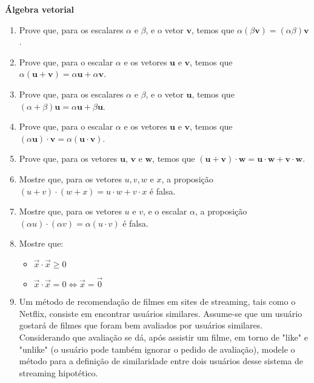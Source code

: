 \documentclass[]{book}
\theoremstyle{definition}
\begin{document}
\textbf{Álgebra vetorial}
\begin{enumerate}

\item \label{caushw} Prove que, para os escalares $\alpha$ e $\beta$, e o vetor $\textbf{v}$, temos que $\alpha (\beta \textbf{v}) = (\alpha \beta) \textbf{v}$.

\item \label{caushw} Prove que, para o escalar $\alpha$ e os vetores $\textbf{u}$ e $\textbf{v}$, temos que $\alpha (\textbf{u} + \textbf{v}) = \alpha \textbf{u} + \alpha \textbf{v}$.

\item \label{caushw} Prove que, para os escalares $\alpha$ e $\beta$, e o vetor $\textbf{u}$, temos que $(\alpha + \beta) \textbf{u} = \alpha \textbf{u} + \beta \textbf{u}$.

\item \label{caushw} Prove que, para o escalar $\alpha$ e os vetores $\textbf{u}$ e $\textbf{v}$, temos que $(\alpha \textbf{u}) \cdot \textbf{v} = \alpha (\textbf{u} \cdot \textbf{v})$.

\item \label{caushw} Prove que, para os vetores $\textbf{u}$, $\textbf{v}$ e $\textbf{w}$, temos que $(\textbf{u} + \textbf{v}) \cdot \textbf{w} = \textbf{u} \cdot \textbf{w} + \textbf{v} \cdot \textbf{w}$.

\item \label{caushw} Mostre que, para os vetores $u, v, w$ e $x$, a proposição $ (u + v) \cdot (w + x) = u \cdot w + v \cdot x$ é falsa.

\item \label{caushw} Mostre que, para os vetores $u$ e $v$, e o escalar $\alpha$, a proposição $(\alpha u) \cdot (\alpha v) = \alpha (u \cdot v)$ é falsa.

\item \label{caushw} Mostre que:

\begin{itemize}
\item $\Vec{x} \cdot \Vec{x} \geq 0$
\item $\Vec{x} \cdot \Vec{x} = 0 \iff \Vec{x} = \Vec{0}$
\end{itemize}

\item \label{caushw} Um método de recomendação de filmes em sites de streaming, tais como o Netflix, consiste em encontrar usuários similares. Assume-se que um usuário gostará de filmes que foram bem avaliados por usuários similares. Considerando que avaliação se dá, após assistir um filme, em torno de "like" e "unlike" (o usuário pode também ignorar o pedido de avaliação), modele o método para a definição de similaridade entre dois usuários desse sistema de streaming hipotético.


\end{enumerate}
\end{document}

